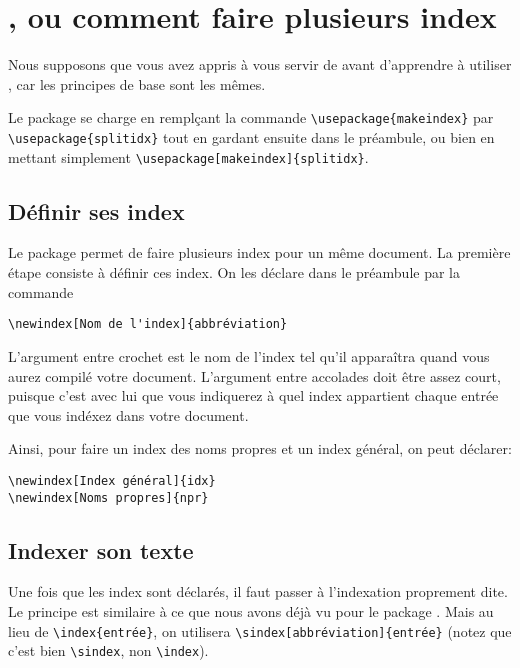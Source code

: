 \section{, ou comment faire plusieurs index} \label{splitindex}

\begin{prealable}
Nous supposons que vous avez appris à vous servir de  avant d'apprendre à utiliser , car les principes de base sont les mêmes.
\end{prealable}

Le package se charge en remplçant la commande \verb|\usepackage{makeindex}| par \verb|\usepackage{splitidx}| tout en gardant ensuite  dans le préambule, ou bien en mettant simplement  \verb|\usepackage[makeindex]{splitidx}|.

\subsection{Définir ses index}

Le package  permet de faire plusieurs index pour un même document. La première étape consiste à définir ces index. On les déclare dans le préambule par la commande 
\begin{verbatim}
\newindex[Nom de l'index]{abbréviation}
\end{verbatim}

L'argument entre crochet est le nom de l'index tel qu'il apparaîtra quand vous aurez compilé votre document. L'argument entre accolades doit être assez court, puisque c'est avec lui que vous indiquerez à quel index appartient chaque entrée que vous indéxez dans votre document.


Ainsi, pour faire un index des noms propres et un index général, on peut déclarer:
\begin{verbatim}
\newindex[Index général]{idx}
\newindex[Noms propres]{npr}
\end{verbatim}

\subsection{Indexer son texte}
Une fois que les index sont déclarés, il faut passer à l'indexation proprement dite. Le principe est similaire à ce que nous avons déjà vu pour le package . Mais au lieu de \verb+\index{entrée}+, on utilisera \verb|\sindex[abbréviation]{entrée}| (notez que c'est bien \verb|\sindex|, non \verb|\index|). 

